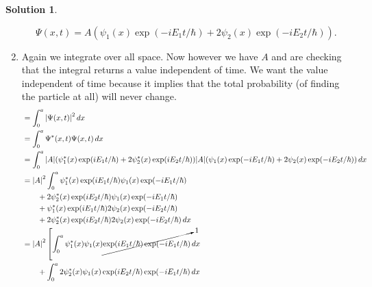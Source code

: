 \documentclass[10pt]{article}
\theoremstyle{definition}
\newtheorem{soln}{Solution}
\begin{document}
\begin{soln}
\begin{enumerate}[label=(\alph*)]
          $$\Psi(x,t)=A(\psi_1(x)\exp(-iE_1t/\hbar)+2\psi_2(x)\exp(-iE_2t/\hbar)).$$
    \item Again we integrate over all space. Now however we have $A$ and are checking that the integral returns a value independent of time.
          We want the value independent of time because it implies that the total probability (of finding the particle at all) will never change.
          \begin{align*}
             & =\int_{0}^{a}\abs{\Psi(x,t)}^2\,dx                                                                                                                    \\
             & =\int_{0}^{a}\Psi^*(x,t)\Psi(x,t)\,dx                                                                                                                 \\
             & =\int_{0}^{a}\abs{A}(\psi_1^*(x)\exp(iE_1t/\hbar)+2\psi_2^*(x)\exp(iE_2t/\hbar))\abs{A}(\psi_1(x)\exp(-iE_1t/\hbar)+2\psi_2(x)\exp(-iE_2t/\hbar))\,dx \\
             & =\abs{A}^2\int_{0}^{a}
            \psi_1^*(x)\exp(iE_1t/\hbar)\psi_1(x)\exp(-iE_1t/\hbar)                                                                                                  \\
             & \qquad+2\psi_2^*(x)\exp(iE_2t/\hbar)\psi_1(x)\exp(-iE_1t/\hbar)                                                                                       \\
             & \qquad+\psi_1^*(x)\exp(iE_1t/\hbar)2\psi_2(x)\exp(-iE_2t/\hbar)                                                                                       \\
             & \qquad+2\psi_2^*(x)\exp(iE_2t/\hbar)2\psi_2(x)\exp(-iE_2t/\hbar)
            \,dx                                                                                                                                                     \\
             & =\abs{A}^2\left[
            \int_{0}^{a}\psi_1^*(x)\psi_1(x)\cancelto{1}{\exp(iE_1t/\hbar)\exp(-iE_1t/\hbar)}\,dx\right.                                                             \\
             & \qquad+\int_{0}^{a}2\psi_2^*(x)\psi_1(x)\exp(iE_2t/\hbar)\exp(-iE_1t/\hbar)\,dx                                                                       \\

\end{align*}
\end{enumerate}
\end{soln}
\end{document}

